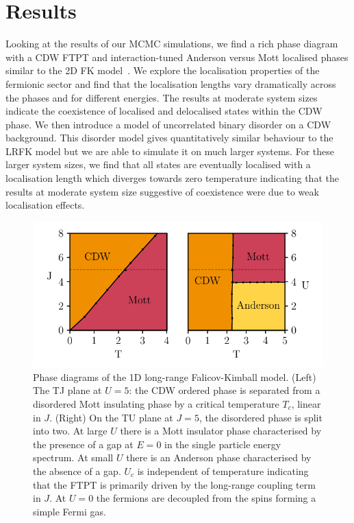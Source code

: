 \hypertarget{sec:lrfk-results}{%
\section{Results}\label{sec:lrfk-results}}

Looking at the results of our MCMC simulations, we find a rich phase diagram with a CDW FTPT and interaction-tuned Anderson versus Mott localised phases similar to the 2D FK model~\autocite{antipovInteractionTunedAndersonMott2016}. We explore the localisation properties of the fermionic sector and find that the localisation lengths vary dramatically across the phases and for different energies. The results at moderate system sizes indicate the coexistence of localised and delocalised states within the CDW phase. We then introduce a model of uncorrelated binary disorder on a CDW background. This disorder model gives quantitatively similar behaviour to the LRFK model but we are able to simulate it on much larger systems. For these larger system sizes, we find that all states are eventually localised with a localisation length which diverges towards zero temperature indicating that the results at moderate system size suggestive of coexistence were due to weak localisation effects.

\hypertarget{fig:phase-diagram-lrfk}{%
\begin{figure}
\centering
\includegraphics[width=1\textwidth,height=\textheight]{figure_code/fk_chapter/phase_diagram/phase_diagram}
\caption[{Long-Range Falicov Kimball Model Phase Diagram}]{Phase diagrams of the 1D long-range Falicov-Kimball model. (Left) The TJ plane at \(U = 5\): the CDW ordered phase is separated from a disordered Mott insulating phase by a critical temperature \(T_c\), linear in \(J\). (Right) On the TU plane at \(J = 5\), the disordered phase is split into two. At large \(U\) there is a Mott insulator phase characterised by the presence of a gap at \(E=0\) in the single particle energy spectrum. At small \(U\) there is an Anderson phase characterised by the absence of a gap. \(U_c\) is independent of temperature indicating that the FTPT is primarily driven by the long-range coupling term in \(J\). At \(U = 0\) the fermions are decoupled from the spins forming a simple Fermi gas.}
\label{fig:phase-diagram-lrfk}
\end{figure}
}

